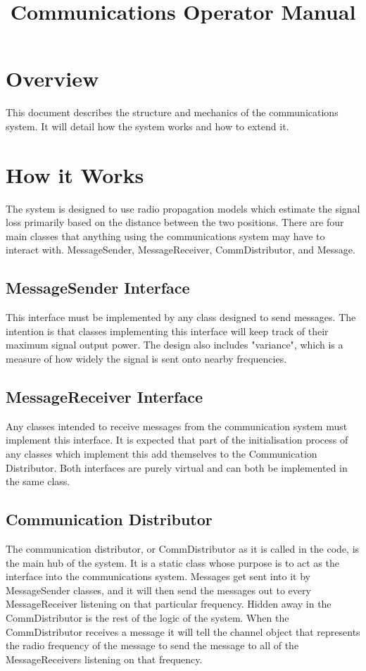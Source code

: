 \documentclass[../main.tex]{subfiles}
\title{Communications Operator Manual}
\begin{document}
\section{Overview}
This document describes the structure and mechanics of the communications system.
It will detail how the system works and how to extend it.

\section{How it Works}
The system is designed to use radio propagation models which estimate the signal loss primarily based on the distance between the two positions.
There are four main classes that anything using the communications system may have to interact with.
MessageSender, MessageReceiver, CommDistributor, and Message.

\subsection{MessageSender Interface}
This interface must be implemented by any class designed to send messages.
The intention is that classes implementing this interface will keep track of their maximum signal output power.
The design also includes "variance", which is a measure of how widely the signal is sent onto nearby frequencies.

\subsection{MessageReceiver Interface}
Any classes intended to receive messages from the communication system must implement this interface.
It is expected that part of the initialisation process of any classes which implement this add themselves to the Communication Distributor.
Both interfaces are purely virtual and can both be implemented in the same class.

\subsection{Communication Distributor}
The communication distributor, or CommDistributor as it is called in the code, is the main hub of the system.
It is a static class whose purpose is to act as the interface into the communications system.
Messages get sent into it by MessageSender classes, and it will then send the messages out to every MessageReceiver listening on that particular frequency.
Hidden away in the CommDistributor is the rest of the logic of the system.
When the CommDistributor receives a message it will tell the channel object that represents the radio frequency of the message to send the message to all of the MessageReceivers listening on that frequency.
\end{document}
